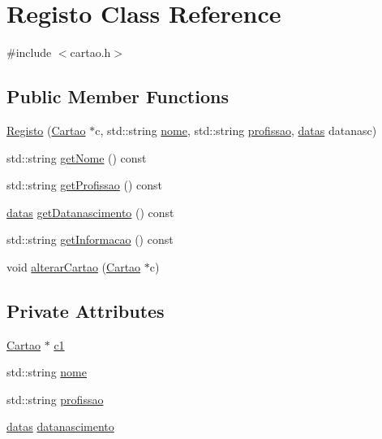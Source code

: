 \hypertarget{class_registo}{}\section{Registo Class Reference}
\label{class_registo}


{\ttfamily \#include $<$cartao.\+h$>$}

\subsection*{Public Member Functions}
\begin{DoxyCompactItemize}
\item 
\mbox{\hyperlink{class_registo_a1dca6558d473be328a35cc844dccbbc4}{Registo}} (\mbox{\hyperlink{class_cartao}{Cartao}} $\ast$c, std\+::string \mbox{\hyperlink{class_registo_a5f387f6835765cfebc7c292c8ca152dd}{nome}}, std\+::string \mbox{\hyperlink{class_registo_aff4608d0155c0e50fbe8d2db6bdc8ec2}{profissao}}, \mbox{\hyperlink{structdatas}{datas}} datanasc)
\item 
std\+::string \mbox{\hyperlink{class_registo_a7302a5c59866e8e008b1bb1e47511b94}{get\+Nome}} () const
\item 
std\+::string \mbox{\hyperlink{class_registo_a218c39c55b2e8f6d546dd3ff45687f6f}{get\+Profissao}} () const
\item 
\mbox{\hyperlink{structdatas}{datas}} \mbox{\hyperlink{class_registo_ac1fca826ae5de2a5a1c32694ea196657}{get\+Datanascimento}} () const
\item 
std\+::string \mbox{\hyperlink{class_registo_ab060c606736697ff17be7504019adf3f}{get\+Informacao}} () const
\item 
void \mbox{\hyperlink{class_registo_a3d4ce2f7e25614391d1bbe2750fafaaf}{alterar\+Cartao}} (\mbox{\hyperlink{class_cartao}{Cartao}} $\ast$c)
\end{DoxyCompactItemize}
\subsection*{Private Attributes}
\begin{DoxyCompactItemize}
\item 
\mbox{\hyperlink{class_cartao}{Cartao}} $\ast$ \mbox{\hyperlink{class_registo_a081486fcc65a8696797eae018b89ab59}{c1}}
\item 
std\+::string \mbox{\hyperlink{class_registo_a5f387f6835765cfebc7c292c8ca152dd}{nome}}
\item 
std\+::string \mbox{\hyperlink{class_registo_aff4608d0155c0e50fbe8d2db6bdc8ec2}{profissao}}
\item 
\mbox{\hyperlink{structdatas}{datas}} \mbox{\hyperlink{class_registo_ab95310053ffb7e2a07e45de4b3e8d62f}{datanascimento}}
\end{DoxyCompactItemize}


